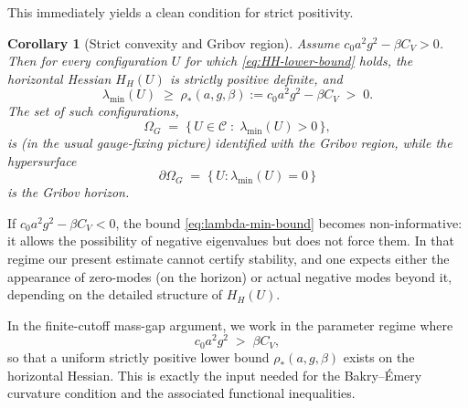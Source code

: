\documentclass[11pt]{article}
\newtheorem{corollary}{Corollary}
\begin{document}
This immediately yields a clean condition for strict positivity.

\begin{corollary}[Strict convexity and Gribov region]
\label{cor:Gribov-region}
Assume $c_0 a^2 g^2 - \beta C_V > 0$. Then for every configuration $U$ for which
\eqref{eq:HH-lower-bound} holds, the horizontal Hessian $H_H(U)$ is strictly positive definite, and
\begin{equation*}
\lambda_{\min}(U) \;\ge\; \rho_\ast(a,g,\beta) := c_0 a^2 g^2 - \beta C_V \;>\; 0.
\end{equation*}
The set of such configurations,
\begin{equation*}
\Omega_G \;=\; \bigl\{\,U \in \mathcal{C} \;:\; \lambda_{\min}(U) > 0\,\bigr\},
\end{equation*}
is (in the usual gauge-fixing picture) identified with the Gribov region, while the hypersurface
\begin{equation*}
\partial\Omega_G \;=\; \{\, U : \lambda_{\min}(U) = 0 \,\}
\end{equation*}
is the Gribov horizon.
\end{corollary}

\begin{remark}
If $c_0 a^2 g^2 - \beta C_V < 0$, the bound \eqref{eq:lambda-min-bound} becomes non-informative: it allows the possibility of negative eigenvalues but does not force them. In that regime our present estimate cannot certify stability, and one expects either the appearance of zero-modes (on the horizon) or actual negative modes beyond it, depending on the detailed structure of $H_H(U)$.

In the finite-cutoff mass-gap argument, we work in the parameter regime where
\begin{equation*}
c_0 a^2 g^2 \;>\; \beta C_V,
\end{equation*}
so that a uniform strictly positive lower bound $\rho_\ast(a,g,\beta)$ exists on the horizontal Hessian. This is exactly the input needed for the Bakry--\'Emery curvature condition and the associated functional inequalities.
\end{remark}
\end{document}
